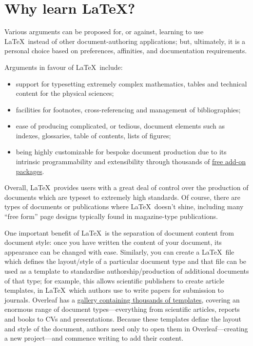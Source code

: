 \section{Why learn \LaTeX?}

Various arguments can be proposed for, or against, learning to use \LaTeX\ instead of other document-authoring applications; but, ultimately, it is a personal choice based on preferences, affinities, and documentation requirements.

Arguments in favour of \LaTeX\ include:

\begin{itemize}
    \item support for typesetting extremely complex mathematics, tables and technical content for the physical sciences;
    \item facilities for footnotes, cross-referencing and management of bibliographies;
    \item ease of producing complicated, or tedious, document elements such as indexes, glossaries, table of contents, lists of figures;
    \item being highly customizable for bespoke document production due to its intrinsic programmability and extensibility through thousands of \href{https://www.ctan.org/pkg}{free add-on packages}.
\end{itemize}

Overall, \LaTeX\ provides users with a great deal of control over the production of documents which are typeset to extremely high standards. Of course, there are types of documents or publications where \LaTeX\ doesn’t shine, including many “free form” page designs typically found in magazine-type publications.

One important benefit of \LaTeX\ is the separation of document content from document style: once you have written the content of your document, its appearance can be changed with ease. Similarly, you can create a \LaTeX\ file which defines the layout/style of a particular document type and that file can be used as a template to standardise authorship/production of additional documents of that type; for example, this allows scientific publishers to create article templates, in \LaTeX\, which authors use to write papers for submission to journals. Overleaf has a \href{https://www.overleaf.com/gallery}{gallery containing thousands of templates}, covering an enormous range of document types—everything from scientific articles, reports and books to CVs and presentations. Because these templates define the layout and style of the document, authors need only to open them in Overleaf—creating a new project—and commence writing to add their content.
